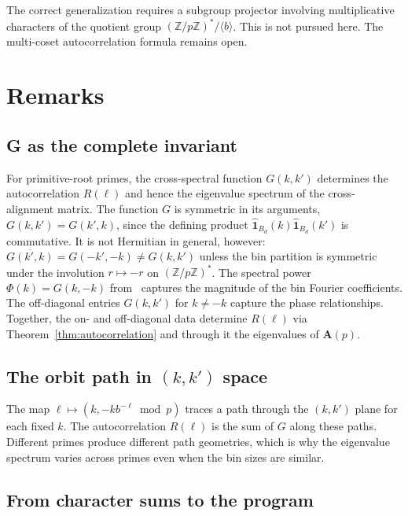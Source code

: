 \documentclass[12pt]{amsart}
\theoremstyle{definition}
\theoremstyle{remark}
\begin{document}
The correct generalization requires a subgroup projector
involving multiplicative characters of the quotient group
$(\mathbb{Z}/p\mathbb{Z})^{*} / \langle b \rangle$.
This is not pursued here. The multi-coset autocorrelation
formula remains open.

\section{Remarks}

\subsection*{G as the complete invariant}

For primitive-root primes, the cross-spectral function
$G(k, k')$ determines the autocorrelation $R(\ell)$ and hence
the eigenvalue spectrum of the cross-alignment matrix.
The function $G$ is symmetric in its arguments,
$G(k, k') = G(k', k)$, since the defining product
$\widehat{\mathbf{1}}_{B_d}(k) \widehat{\mathbf{1}}_{B_d}(k')$
is commutative. It is not Hermitian in general, however:
$\overline{G(k', k)} = G(-k', -k) \ne G(k, k')$ unless the
bin partition is symmetric under the involution
$r \mapsto -r$ on $(\mathbb{Z}/p\mathbb{Z})^*$. The
spectral power $\Phi(k) = G(k, -k)$ from~\cite{paper8}
captures the magnitude of the bin Fourier coefficients.
The off-diagonal entries $G(k, k')$ for $k \ne -k$ capture
the phase relationships. Together, the on- and off-diagonal
data determine $R(\ell)$ via Theorem~\ref{thm:autocorrelation}
and through it the eigenvalues of $\mathbf{A}(p)$.

\subsection*{The orbit path in $(k,k')$ space}

The map $\ell \mapsto (k, -kb^{-\ell} \bmod p)$ traces a path
through the $(k,k')$ plane for each fixed $k$. The
autocorrelation $R(\ell)$ is the sum of $G$ along these paths.
Different primes produce different path geometries, which is why
the eigenvalue spectrum varies across primes even when the bin
sizes are similar.

\subsection*{From character sums to the program}
\end{document}
